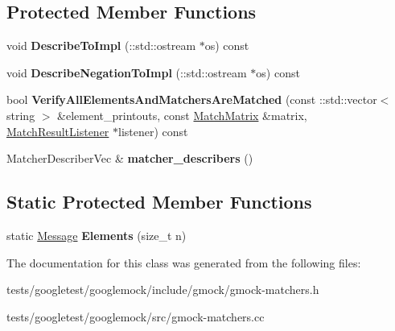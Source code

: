 \subsection*{Protected Member Functions}
\begin{DoxyCompactItemize}
\item 
\mbox{\label{classtesting_1_1internal_1_1UnorderedElementsAreMatcherImplBase_a40318adf9a89d830a26a96b2eb06b4e3}} 
void {\bfseries Describe\+To\+Impl} (\+::std\+::ostream $\ast$os) const
\item 
\mbox{\label{classtesting_1_1internal_1_1UnorderedElementsAreMatcherImplBase_ab3ca5ae4aef146b093a3fb35f53d1a38}} 
void {\bfseries Describe\+Negation\+To\+Impl} (\+::std\+::ostream $\ast$os) const
\item 
\mbox{\label{classtesting_1_1internal_1_1UnorderedElementsAreMatcherImplBase_a515ec900bd84fe4d28e3ccf55db25822}} 
bool {\bfseries Verify\+All\+Elements\+And\+Matchers\+Are\+Matched} (const \+::std\+::vector$<$ string $>$ \&element\+\_\+printouts, const \hyperlink{classtesting_1_1internal_1_1MatchMatrix}{Match\+Matrix} \&matrix, \hyperlink{classtesting_1_1MatchResultListener}{Match\+Result\+Listener} $\ast$listener) const
\item 
\mbox{\label{classtesting_1_1internal_1_1UnorderedElementsAreMatcherImplBase_a04d4adc809d9c06331f8dbb67b879ac0}} 
Matcher\+Describer\+Vec \& {\bfseries matcher\+\_\+describers} ()
\end{DoxyCompactItemize}
\subsection*{Static Protected Member Functions}
\begin{DoxyCompactItemize}
\item 
\mbox{\label{classtesting_1_1internal_1_1UnorderedElementsAreMatcherImplBase_ab6d5a2342e07730b913f419cf662d16a}} 
static \hyperlink{classtesting_1_1Message}{Message} {\bfseries Elements} (size\+\_\+t n)
\end{DoxyCompactItemize}


The documentation for this class was generated from the following files\+:\begin{DoxyCompactItemize}
\item 
tests/googletest/googlemock/include/gmock/gmock-\/matchers.\+h\item 
tests/googletest/googlemock/src/gmock-\/matchers.\+cc\end{DoxyCompactItemize}
